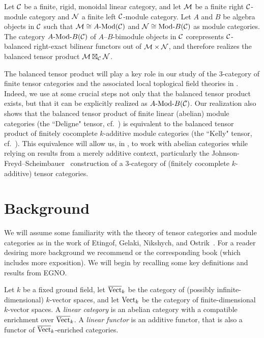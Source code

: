 \documentclass{amsart}
\begin{document}
\begin{theorem*}
Let $\mathcal C$ be a finite, rigid, monoidal linear category, and let $\mathcal M$ be a finite right $\mathcal C$-module category and $\mathcal N$ a finite left $\mathcal C$-module category.  Let $A$ and $B$ be algebra objects in $\mathcal C$ such that $\cM \cong \Mod{A}{}(\cC)$ and $\cN \cong \Mod{}{B}(\cC)$ as module categories.  The category $\Mod{A}{B}(\cC)$ of $A$--$B$-bimodule objects in $\mathcal C$ corepresents $\mathcal C$-balanced right-exact bilinear functors out of $\mathcal M \times \mathcal N$, and therefore realizes the balanced tensor product $\mathcal M \boxtimes_\mathcal C \mathcal N$.
\end{theorem*}

The balanced tensor product will play a key role in our study of the $3$-category of finite tensor categories and the associated local toplogical field theories in \cite{DTCI}.  Indeed, we use at some crucial steps not only that the balanced tensor product exists, but that it can be explicitly realized as $\Mod{A}{B}(\cC)$.  Our realization also shows that the balanced tensor product of finite linear (abelian) module categories (the ``Deligne" tensor, cf.~\cite{MR1106898}) is equivalent to the balanced tensor product of finitely cocomplete $k$-additive module categories (the ``Kelly" tensor, cf.~\cite{MR651714, MR648793}).  This equivalence will allow us, in \cite{DTCI}, to work with abelian categories while relying on results from a merely additive context, particularly the Johnson-Freyd--Scheimbauer~\cite{1502.06526} construction of a 3-category of (finitely cocomplete $k$-additive) tensor categories.

\section{Background}

We will assume some familiarity with the theory of tensor categories and module categories as in the work of Etingof, Gelaki, Nikshych, and Ostrik~\cite{EGNO, EO-ftc, MR2183279, MR2097289,0909.3140}.  For a reader desiring more background we recommend \cite{EGNO} or the corresponding book \cite{egno-book} (which includes more exposition).  We will begin by recalling some key definitions and results from EGNO.

	Let $k$ be a fixed ground field, let $\overline{\mathrm{Vect}}_k$ be the category of (possibly infinite-dimensional) $k$-vector spaces, and let $\mathrm{Vect}_k$ be the category of finite-dimensional $k$-vector spaces.   A {\em linear category} is an abelian category with a compatible enrichment over $\overline{\mathrm{Vect}}_k$. 
A {\em linear functor} is an additive functor, that is also a functor of $\overline{\mathrm{Vect}}_k$-enriched categories. 
\end{document}
